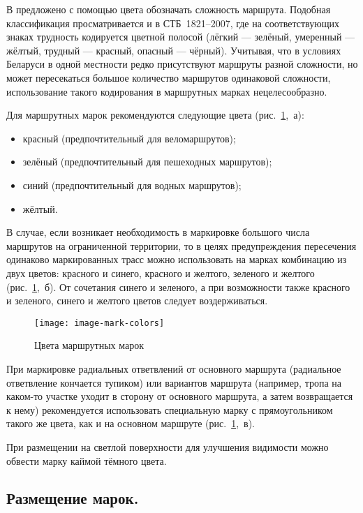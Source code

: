 \documentclass[a4paper,12pt,titlepage]{extarticle}
\begin{document}
В \cite{metodussr} предложено с помощью цвета обозначать сложность маршрута. Подобная классификация просматривается и в
СТБ~1821--2007, где на соответствующих знаках трудность кодируется цветной полосой  (лёгкий --- зелёный, умеренный ---
жёлтый, трудный --- красный, опасный --- чёрный). Учитывая, что в условиях Беларуси в одной местности редко присутствуют
маршруты разной сложности, но может пересекаться большое количество маршрутов одинаковой сложности, использование такого
кодирования в маршрутных марках нецелесообразно.

Для маршрутных марок рекомендуются следующие цвета (рис.~\ref{fig:mark-colors},~а):
\begin{itemize}
	\item красный (предпочтительный для веломаршрутов);
	\item зелёный (предпочтительный для пешеходных маршрутов);
	\item синий (предпочтительный для водных маршрутов);
	\item жёлтый.
\end{itemize}

В случае, если возникает необходимость в маркировке большого числа маршрутов на ограниченной территории, то в целях
предупреждения пересечения одинаково маркированных трасс можно использовать на марках комбинацию из двух цветов:
красного и синего, красного и желтого, зеленого и желтого (рис.~\ref{fig:mark-colors},~б). От сочетания синего и зеленого, а при возможности
также красного и зеленого, синего и желтого цветов следует воздерживаться.

\begin{figure}[ht]
	\centering
	\texttt{[image: image-mark-colors]}
	\caption{Цвета маршрутных марок}\label{fig:mark-colors}
\end{figure}


При маркировке радиальных ответвлений от основного маршрута (радиальное ответвление кончается тупиком) или вариантов
маршрута (например, тропа на каком-то участке уходит в сторону от основного маршрута, а затем возвращается к нему)
рекомендуется использовать специальную марку с прямоугольником такого же цвета, как и на основном маршруте (рис.~\ref{fig:mark-colors},~в).

При размещении на светлой поверхности для улучшения видимости можно обвести марку каймой тёмного цвета.

\subsection{Размещение марок.}
\end{document}
